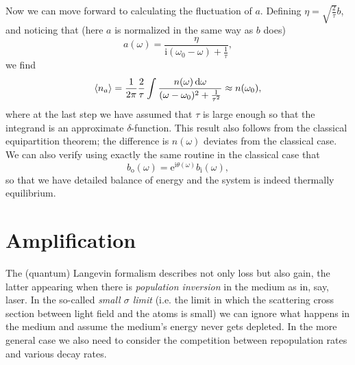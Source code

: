 \documentclass[hyperref, a4paper]{article}
\newcommand*{\ii}{\mathrm{i}}
\newcommand*{\ee}{\mathrm{e}}
\newcommand*{\bi}{b_{\text{i}}}
\newcommand*{\bo}{b_{\text{o}}}
\begin{document}
Now we can move forward to calculating the fluctuation of $a$.
Defining $\eta = \sqrt{\frac{2}{\tau}} b$,
and noticing that (here $a$ is normalized in the same way as $b$ does)
\begin{equation}
    a(\omega) = \frac{\eta}{\ii(\omega_0 - \omega) + \frac{1}{\tau}},
\end{equation}
we find 
\begin{equation}
    \expval{n_a} = \frac{1}{2\pi} \frac{2}{\tau} \int \frac{n(\omega) \dd{\omega}}{(\omega - \omega_0)^2 + \frac{1}{\tau^2}} \approx 
    n(\omega_0),
\end{equation}
where at the last step we have assumed that $\tau$ is large enough so that the integrand is an approximate $\delta$-function.
This result also follows from the classical equipartition theorem;
the difference is $n(\omega)$ deviates from the classical case.
We can also verify using exactly the same routine in the classical case that 
\begin{equation}
    \bo(\omega) = \ee^{\ii \theta(\omega)} \bi(\omega),
\end{equation}
so that we have detailed balance of energy and the system is indeed thermally equilibrium.

\section{Amplification}\label{sec:amplification}

The (quantum) Langevin formalism describes not only loss but also gain,
the latter appearing when there is \emph{population inversion} in the medium as in, say, laser.
In the so-called \emph{small $\sigma$ limit} 
(i.e. the limit in which the scattering cross section between light field and the atoms is small)
we can ignore what happens in the medium and assume the medium's energy never gets depleted.
In the more general case we also need to consider the competition 
between repopulation rates and various decay rates.
\end{document}
